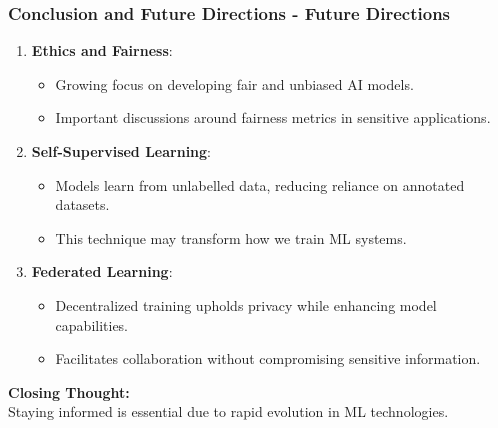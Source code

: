 \documentclass[aspectratio=169]{beamer}
\begin{document}
\begin{frame}[fragile]
    \frametitle{Conclusion and Future Directions - Future Directions}
    \begin{enumerate}
        \item \textbf{Ethics and Fairness}:
            \begin{itemize}
                \item Growing focus on developing fair and unbiased AI models.
                \item Important discussions around fairness metrics in sensitive applications.
            \end{itemize}
        \item \textbf{Self-Supervised Learning}:
            \begin{itemize}
                \item Models learn from unlabelled data, reducing reliance on annotated datasets.
                \item This technique may transform how we train ML systems.
            \end{itemize}
        \item \textbf{Federated Learning}:
            \begin{itemize}
                \item Decentralized training upholds privacy while enhancing model capabilities.
                \item Facilitates collaboration without compromising sensitive information.
            \end{itemize}
    \end{enumerate}
    \textbf{Closing Thought:} \\
    Staying informed is essential due to rapid evolution in ML technologies.
\end{frame}
\end{document}
